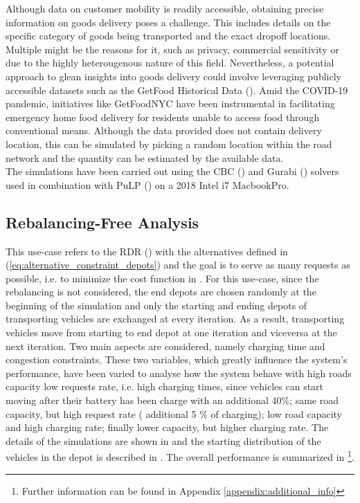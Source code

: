 Although data on customer mobility is readily accessible, obtaining precise information on goods delivery poses a challenge. This includes details on the specific category of goods being transported and the exact dropoff locations. Multiple might be the reasons for it, such as privacy, commercial sensitivity or due to the highly heterougenous nature of this field. Nevertheless, a potential approach to glean insights into goods delivery could involve leveraging publicly accessible datasets such as the GetFood Historical Data (\cite{getfoodnyc}). Amid the COVID-19 pandemic, initiatives like GetFoodNYC have been instrumental in facilitating emergency home food delivery for residents unable to access food through conventional means. Although the data provided does not contain delivery location, this can be simulated by picking a random location within the road network and the quantity can be estimated by the available data.\\
The simulations have been carried out using the CBC (\cite{schumacher2022rcbc}) and Gurabi (\cite{gurobi}) solvers used in combination with PuLP (\cite{dunning2011pulp}) on a 2018 Intel i7 MacbookPro. 

\subsection{Rebalancing-Free Analysis}
This use-case refers to the RDR () with the alternatives defined in (\ref{eq:alternative_constraint_depots}) and the goal is to serve as many requests as possible, i.e. to minimize the cost function in .  For this use-case, since the rebalancing is not considered, the end depots are chosen randomly at the beginning of the simulation and only the starting and ending depots of transporting vehicles are exchanged at every iteration. As a result, transporting vehicles move from starting to end depot at one iteration and viceversa at the next iteration. Two main aspects are considered, namely charging time and congestion constraints. These two variables, which greatly influence the system's performance, have been varied to analyse how the system behave with  high roads capacity low requests rate, i.e. high charging times, since vehicles can start moving after their battery has been charge with an additional 40\%;  same road capacity, but high request rate ( additional 5 \% of charging);  low road capacity and high charging rate; finally  lower capacity, but higher charging rate. 
 The details of the simulations are shown in  and the starting distribution of the vehicles in the depot is described in . The overall performance is summarized in \footnote{Further information can be found in Appendix \ref{appendix:additional_info}
 }.  \\




